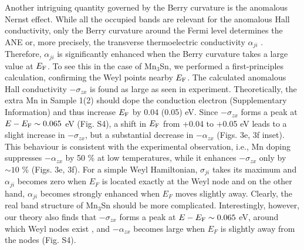 \documentclass[amsmath,amssymb]{nature}
\begin{document}
 Another intriguing quantity governed by the Berry curvature is the anomalous Nernst effect. While all the occupied bands are relevant for the anomalous Hall conductivity, only the Berry curvature around the Fermi level determines the ANE or, more precisely, the transverse thermoelectric conductivity $\alpha_{ji}$ \cite{Xiao2006,Niu2010}. Therefore, %
$\alpha_{ji}$ is significantly enhanced when the Berry curvature takes a large value at $E_{\rm F}$. To see this in the case of Mn$_3$Sn, we performed a first-principles calculation, confirming the Weyl points nearby $E_{\rm F}$\cite{Yang2016}. The calculated anomalous Hall conductivity $-\sigma_{zx}$ is found as large as seen in experiment.
Theoretically, the extra Mn in Sample 1(2) should dope the conduction electron (Supplementary Information) and thus increase $E_{\rm F}$ by 0.04 (0.05) eV.  Since $-\sigma_{zx}$ forms a peak at $E-E_{\rm F} \sim 0.065$ eV (Fig. S4), a shift in $E_{\rm F}$ from +0.04 to +0.05 eV leads to a slight increase in $-\sigma_{zx}$, but a substantial decrease in $-\alpha_{zx}$ (Figs. 3e, 3f inset). This behaviour is consistent with the experimental observation, i.e., Mn doping suppresses $-\alpha_{zx}$ by 50 \% at low temperatures, while it enhances $-\sigma_{zx}$ only by $\sim 10$ \% (Figs. 3e, 3f). %
	For a simple Weyl Hamiltonian, $\sigma_{ji}$ takes its maximum and $\alpha_{ji}$ becomes zero when $E_F$ is located exactly at the Weyl node and on the other hand, $\alpha_{ji}$ becomes strongly enhanced when $E_F$ moves slightly away\cite{Pallab2015}. Clearly, the real band structure of Mn$_3$Sn should be more complicated.  Interestingly, however, our theory also finds that $-\sigma_{zx}$ forms a peak at $E-E_{\rm F} \sim 0.065$ eV, around which Weyl nodes exist \cite{Yang2016}, and $-\alpha_{zx}$ becomes large when $E_F$ is slightly away from the nodes (Fig. S4).
\end{document}

